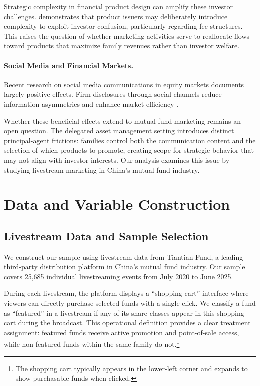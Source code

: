 \documentclass[12pt]{article}
\begin{document}
Strategic complexity in financial product design can amplify these investor challenges. \citet{carlin2009strategic} demonstrates that product issuers may deliberately introduce complexity to exploit investor confusion, particularly regarding fee structures. This raises the question of whether marketing activities serve to reallocate flows toward products that maximize family revenues rather than investor welfare. %

\paragraph{Social Media and Financial Markets.} Recent research on social media communications in equity markets documents largely positive effects. Firm disclosures through social channels reduce information asymmetries and enhance market efficiency \citep{blankespoor2014role, jung2018firms, lee2022talk, nekrasov2022visuals, choi2024investor, crowley2024discretionary, wong2024calling}.

Whether these beneficial effects extend to mutual fund marketing remains an open question. The delegated asset management setting introduces distinct principal-agent frictions: families control both the communication content and the selection of which products to promote, creating scope for strategic behavior that may not align with investor interests. Our analysis examines this issue by studying livestream marketing in China's mutual fund industry.


\section{Data and Variable Construction}\label{sec:data}

\subsection{Livestream Data and Sample Selection}\label{subsec:sample}

We construct our sample using livestream data from Tiantian Fund, a leading third-party distribution platform in China's mutual fund industry. Our sample covers 25,685 individual livestreaming events from July 2020 to June 2025.

During each livestream, the platform displays a ``shopping cart'' interface where viewers can directly purchase selected funds with a single click. We classify a fund as ``featured'' in a livestream if any of its share classes appear in this shopping cart during the broadcast. This operational definition provides a clear treatment assignment: featured funds receive active promotion and point-of-sale access, while non-featured funds within the same family do not.\footnote{The shopping cart typically appears in the lower-left corner and expands to show purchasable funds when clicked.}
\end{document}
